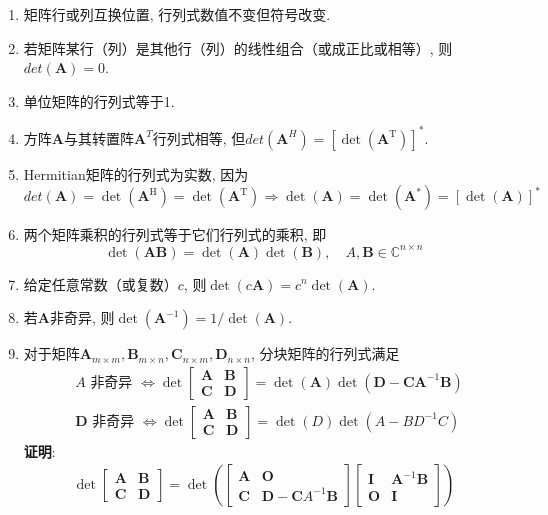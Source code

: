 \documentclass[lang=cn,10pt]{gorgeousnbook}
\numberwithin{equation}{section}%
\numberwithin{figure}{section}%
\begin{document}
\begin{enumerate}
    \item 矩阵行或列互换位置, 行列式数值不变但符号改变. 
    \item 若矩阵某行（列）是其他行（列）的线性组合（或成正比或相等）, 则$det(\bm{A})=0$.
    \item 单位矩阵的行列式等于1.
    \item 方阵$\bm{A}$与其转置阵$\bm{A}^T$行列式相等, 但$det(\bm{A}^H)=[\det(\bm{A}^{\mathrm{T}})]^{*}$.
    \item Hermitian矩阵的行列式为实数, 因为
    \begin{equation}  det(\boldsymbol{A})=\det(\boldsymbol{A}^\mathrm{H})=\det(\boldsymbol{A}^\mathrm{T})\Rightarrow\det(\boldsymbol{A})=\det(\boldsymbol{A}^*)=[\det(\boldsymbol{A})]^*
    \end{equation}
    \item 两个矩阵乘积的行列式等于它们行列式的乘积, 即
    \begin{equation} 
    \det(\boldsymbol{AB})=\det(\boldsymbol{A})\det(\boldsymbol{B}),\quad A,\boldsymbol{B}\in\mathbb{C}^{n\times n}
    \end{equation}
    \item 给定任意常数（或复数）$c$, 则$\det(c\boldsymbol{A})=c^n\det(\boldsymbol{A})$.
    \item 若$\bm{A}$非奇异, 则$\det(\boldsymbol{A}^{-1})=1/\det(\boldsymbol{A})$.
    \item 对于矩阵$\bm{A}_{m\times m},\bm{B}_{m\times n},\bm{C}_{n\times m},\bm{D}_{n\times n}$, 分块矩阵的行列式满足
    \begin{equation} 
    \begin{aligned}&A\text{ 非奇异 }\Longleftrightarrow\det\begin{bmatrix}\bm{A}&\bm{B}\\\bm{C}&\bm{D}\end{bmatrix}=\det(\bm{A})\det(\bm{D}-\bm{CA}^{-1}\bm{B})\\&\bm{D}\text{ 非奇异 }\Longleftrightarrow\det\begin{bmatrix}\bm{A}&\bm{B}\\\bm{C}&\bm{D}\end{bmatrix}=\det(D)\det(A-BD^{-1}C)\end{aligned}
    \end{equation}
    \textbf{证明}:
    \begin{equation} 
    \begin{gathered}
        \det\begin{bmatrix}\bm{A}&\bm{B}\\\bm{C}&\bm{D}\end{bmatrix} =\det\left(\begin{bmatrix}\boldsymbol{A}&\boldsymbol{O}\\\boldsymbol{C}&\boldsymbol{D}-\boldsymbol{C}A^{-1}\boldsymbol{B}\end{bmatrix}\begin{bmatrix}\boldsymbol{I}&\boldsymbol{A}^{-1}\boldsymbol{B}\\\boldsymbol{O}&\boldsymbol{I}\end{bmatrix}\right) \\

\end{gathered}
\end{equation}
\end{enumerate}
\end{document}
